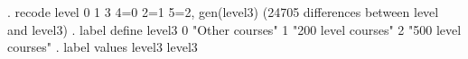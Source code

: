 . recode level 0 1 3 4=0 2=1 5=2, gen(level3)
(24705 differences between level and level3)
{\smallskip}
. label define level3 0 "Other courses" 1 "200 level courses" 2 "500 level courses"
{\smallskip}
. label values level3 level3 
{\smallskip}
